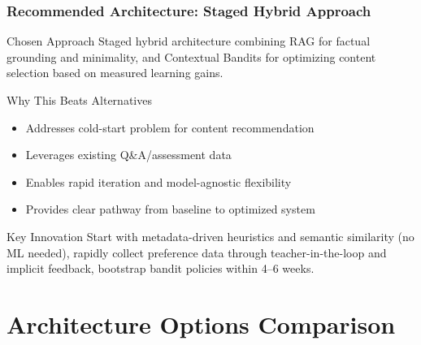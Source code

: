 \documentclass[aspectratio=169]{beamer}
\begin{document}
\begin{frame}
\frametitle{Recommended Architecture: Staged Hybrid Approach}
\begin{block}{Chosen Approach}
Staged hybrid architecture combining RAG for factual grounding and minimality, and Contextual Bandits for optimizing content selection based on measured learning gains.
\end{block}

\begin{block}{Why This Beats Alternatives}
\begin{itemize}
\item \textcolor{mygreen}{Addresses cold-start problem} for content recommendation
\item \textcolor{mygreen}{Leverages existing Q\&A/assessment data}
\item \textcolor{mygreen}{Enables rapid iteration} and model-agnostic flexibility
\item \textcolor{mygreen}{Provides clear pathway} from baseline to optimized system
\end{itemize}
\end{block}

\begin{alertblock}{Key Innovation}
Start with metadata-driven heuristics and semantic similarity (no ML needed), rapidly collect preference data through teacher-in-the-loop and implicit feedback, bootstrap bandit policies within 4--6 weeks.
\end{alertblock}
\end{frame}

\section{Architecture Options Comparison}
\end{document}
